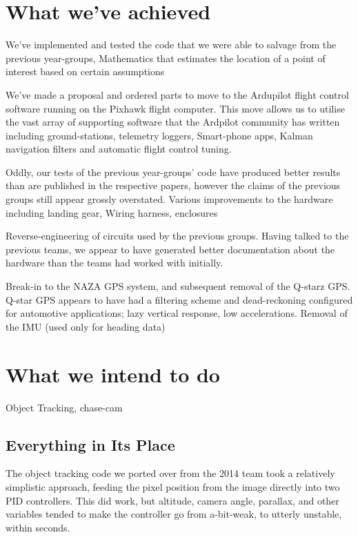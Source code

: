 \documentclass[11pt]{article}
\begin{document}
  \section{What we've achieved}
    We've implemented and tested the code that we were able to salvage from the previous year-groups,
    Mathematics that estimates the location of a point of interest based on certain assumptions

    We've made a proposal and ordered parts to move to the Ardupilot flight control software running on the Pixhawk flight computer.
    This move allows us to utilise the vast array of supporting software that the Ardpilot community has written including ground-stations, telemetry loggers, Smart-phone apps, Kalman navigation filters and automatic flight control tuning.

    Oddly, our tests of the previous year-groups' code have produced better results than are published in the respective papers, however the claims of the previous groups still appear grossly overstated.
    Various improvements to the hardware including landing gear, Wiring harness, enclosures

    Reverse-engineering of circuits used by the previous groups. Having talked to the previous teams, we appear to have generated better documentation about the hardware than the teams had worked with initially.

    Break-in to the NAZA GPS system, and subsequent removal of the Q-starz GPS.  Q-star GPS appears to have had a filtering scheme and dead-reckoning configured for automotive applications; lazy vertical response, low accelerations.
    Removal of the IMU (used only for heading data)




  \section{What we intend to do}
    Object Tracking, chase-cam 
    \subsection{Everything in Its Place}
      The object tracking code we ported over from the 2014 team took a relatively simplistic approach, feeding the pixel position from the image directly into two PID controllers.  This did work, but altitude, camera angle, parallax, and other variables tended to make the controller go from a-bit-weak, to utterly unstable, within seconds.
\end{document}

